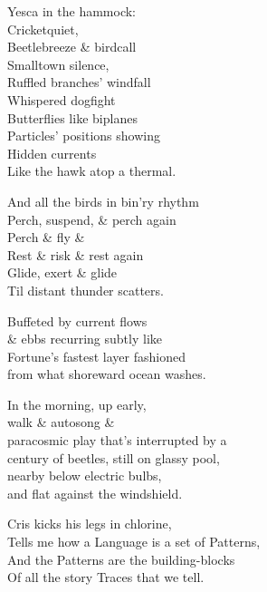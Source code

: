 Yesca in the hammock: \\
Cricketquiet, \\
Beetlebreeze \& birdcall \\
Smalltown silence, \\
Ruffled branches' windfall \\
Whispered dogfight \\
Butterflies like biplanes \\
Particles' positions showing \\
Hidden currents \\
Like the hawk atop a thermal.

And all the birds in bin'ry rhythm \\
Perch, suspend, \& perch again \\
Perch \& fly \& \\
Rest \& risk \& rest again \\
Glide, exert \& glide \\
Til distant thunder scatters.

Buffeted by current flows \\
\& ebbs recurring subtly like \\
Fortune's fastest layer fashioned \\
from what shoreward ocean washes.

In the morning, up early, \\
walk \& autosong \& \\
paracosmic play that's interrupted by a \\
century of beetles, still on glassy pool, \\
nearby below electric bulbs, \\
and flat against the windshield.

Cris kicks his legs in chlorine, \\
Tells me how a Language is a set of Patterns, \\
And the Patterns are the building-blocks \\
Of all the story Traces that we tell.